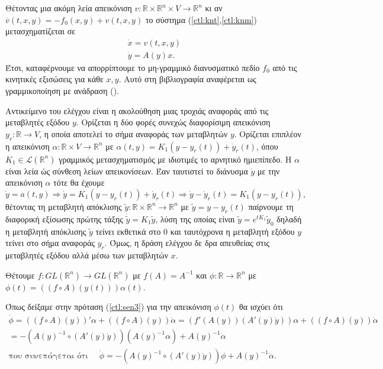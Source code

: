 Θέτοντας μια ακόμη λεία απεικόνιση $v:\mathbb{R}\times\mathbb
{R}^n\times V \rightarrow \mathbb{R}^n $ κι αν $\overline{v}(t,x,y) = -f_0(x,y) 
+ v(t,x,y)$ το σύστημα (\ref{ctl:knt},\ref{ctl:knm}) μετασχηματίζεται σε
\begin{gather}
    \dot{x} = v(t,x,y)\\
    {\dot{y}} = A({y}) {x}.
\end{gather}
Έτσι, καταφέρνουμε να απορρίπτουμε το μη-γραμμικό διανυσματικό πεδίο $f_0$  από 
τις κινητικές εξισώσεις για κάθε $x,y$. Αυτό στη βιβλιογραφία αναφέρεται ως 
γραμμικοποίηση με ανάδραση ().

Αντικείμενο του ελέγχου είναι η ακολούθηση μιας τροχιάς αναφοράς από τις 
μεταβλητές εξόδου $y$. Ορίζεται η δύο φορές συνεχώς διαφορίσιμη απεικόνιση 
$y_r:\mathbb{R}\rightarrow V$, η οποία αποτελεί το σήμα αναφοράς των μεταβλητών 
$y$. Ορίζεται επιπλέον η απεικόνιση $\alpha:\mathbb{R}\times V\rightarrow 
\mathbb{R}^n$ με $\alpha(t,y) = K_1(y-y_r(t)) + \dot{y}_r(t)$, όπου $K_1 \in 
\mathcal{L}(\mathbb{R}^n)$ γραμμικός μετασχηματισμός με ιδιοτιμές το αρνητικό 
ημιεπίπεδο. Η $\alpha$ είναι λεία ώς σύνθεση λείων απεικονίσεων. Έαν ταυτιστεί 
το διάνυσμα $\dot{y}$ με την απεικόνιση $\alpha$ τότε θα έχουμε
\begin{equation*}
    \dot{y} = a(t,y) \Rightarrow \dot{y} = K_1\left(y-y_r(t)\right) + 
    \dot{y}_r(t) \Rightarrow \dot{y} - \dot{y}_r(t) = K_1(y - y_r(t)),
\end{equation*}
θέτοντας τη μεταβλητή απόκλισης $\widetilde{y}:\mathbb{R}\times \mathbb{R}^n 
\rightarrow \mathbb{R}^n$ με $\widetilde{y} = y - y_r(t)$ παίρνουμε τη 
διαφορική εξίσωσης πρώτης τάξης $\dot{\widetilde{y}} = K_1 \widetilde{y}$, λύση 
της οποίας είναι $\widetilde{y} = e^{tK_1}\widetilde{y}_0 $ δηλαδή η μεταβλητή 
απόκλισης $\widetilde{y}$ τείνει εκθετικά στο 0 και ταυτόχρονα η μεταβλητή 
εξόδου $y$ τείνει στο σήμα αναφοράς $y_r$. Όμως, η δράση ελέγχου δε δρα 
απευθείας στις μεταβλητές εξόδου αλλά μέσω των μεταβλητών $x$.

Θέτουμε $f:\!GL\left(\mathbb{R}^n\right)\!\rightarrow GL\left(\mathbb{R}^n
\right)$ με $f\left(A\right)\!=\! A^{-1}$ και $\phi\!:\mathbb{R}\!\rightarrow 
\mathbb{R}^n$ με $\phi(t)\!= \left(\left(f \circ A\right)\left(y\left(t\right)
\right)\right)\alpha\left(t\right)$.

Όπως δείξαμε στην πρόταση (\ref{ctl:sen3}) για την απεικόνιση $\phi(t)$ θα 
ισχύει ότι
\begin{gather*}
    \dot{\phi} = \left(\left(f \circ A\right)(y)\right)'\alpha+ \left(\left(f 
    \circ A\right)(y)\right)\dot{\alpha} = \left(f'\left(A(y)\right)\left(A'(y)
    \dot{y}\right)\right)\alpha+ \left(\left(f \circ A\right)(y)\right)
    \dot{\alpha}\\
    = -\left(A(y)^{-1} \circ \left(A'(y)\dot{y}\right)\right) \left(A(y)^{-1} 
    \alpha \right) + A(y)^{-1}\dot{\alpha}  \\
    \text{που συνεπάγεται ότι }\quad\dot{\phi} = -\left(A(y)^{-1} \circ 
    \left(A'(y) \dot{y}\right)\right)\phi + A(y)^{-1}\dot{\alpha}.
\end{gather*}

